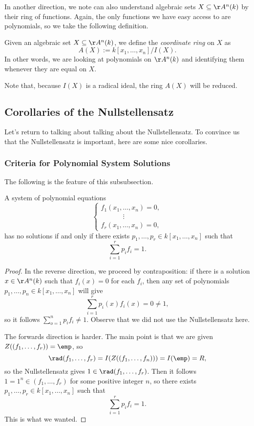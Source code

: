 In another direction, we note can also understand algebraic sets $X\subseteq\AA^n(k)$ by their ring of functions. Again, the only functions we have easy access to are polynomials, so we take the following definition.
\begin{definition}
	Given an algebraic set $X\subseteq\AA^n(k)$, we define the \textit{coordinate ring} on $X$ as
	\[A(X):=k[x_1,\ldots,x_n]/I(X).\]
	In other words, we are looking at polynomials on $\AA^n(k)$ and identifying them whenever they are equal on $X$.
\end{definition}
Note that, because $I(X)$ is a radical ideal, the ring $A(X)$ will be reduced.

\subsection{Corollaries of the Nullstellensatz}
Let's return to talking about talking about the Nullstellensatz. To convince us that the Nullstellensatz is important, here are some nice corollaries.

\subsubsection{Criteria for Polynomial System Solutions}
The following is the feature of this subsubsection.
\begin{corollary}
	A system of polynomial equations
	\[\begin{cases}
		f_1(x_1,\ldots,x_n) = 0, \\
		\qquad\quad~\vdots \\
		f_r(x_1,\ldots,x_n) = 0,
	\end{cases}\]
	has no solutions if and only if there exists $p_1,\ldots,p_r\in k[x_1,\ldots,x_n]$ such that
	\[\sum_{i=1}^rp_if_i=1.\]
\end{corollary}
\begin{proof}
	In the reverse direction, we proceed by contraposition: if there is a solution $x\in\AA^n(k)$ such that $f_i(x)=0$ for each $f_i$, then any set of polynomials $p_1,\ldots,p_n\in k[x_1,\ldots,x_n]$ will give
	\[\sum_{i=1}^rp_i(x)f_i(x)=0\ne1,\]
	so it follows $\sum_{o=1}^np_if_i\ne1$. Observe that we did not use the Nullstellensatz here.

	The forwards direction is harder. The main point is that we are given $Z((f_1,\ldots,f_r))=\emp$, so
	\[\rad(f_1,\ldots,f_r)=I(Z((f_1,\ldots,f_n)))=I(\emp)=R,\]
	so the Nullstellensatz gives $1\in\rad(f_1,\ldots,f_r)$. Then it follows $1=1^n\in(f_1,\ldots,f_r)$ for some positive integer $n$, so there exists $p_1,\ldots,p_r\in k[x_1,\ldots,x_n]$ such that
	\[\sum_{i=1}^rp_if_i=1.\]
	This is what we wanted.
\end{proof}

